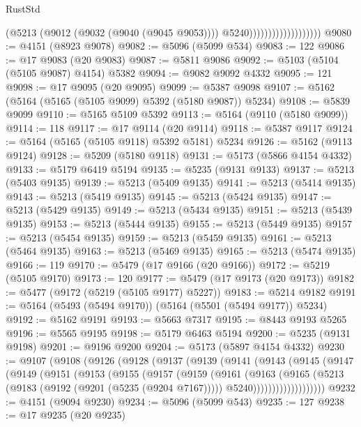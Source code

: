 \begin{lexlean}{RustStd}
\begin{coremodule}
                                        (@5213
                                          (@9012 (@9032 (@9040 (@9045 @9053))))
                                          @5240)))))))))))))))))))
@9080 := @4151 (@8923 @9078)
@9082 := @5096 (@5099 @534)
@9083 := 122
@9086 := @17 @9083 (@20 @9083)
@9087 := @5811 @9086
@9092 := @5103 (@5104 (@5105 @9087) @4154) @5382
@9094 := @9082 @9092 @4332
@9095 := 121
@9098 := @17 @9095 (@20 @9095)
@9099 := @5387 @9098
@9107 := @5162 (@5164 (@5165 (@5105 @9099) @5392 (@5180 @9087)) @5234)
@9108 := @5839 @9099
@9110 := @5165 @5109 @5392
@9113 := @5164 (@9110 (@5180 @9099))
@9114 := 118
@9117 := @17 @9114 (@20 @9114)
@9118 := @5387 @9117
@9124 := @5164 (@5165 (@5105 @9118) @5392 @5181) @5234
@9126 := @5162 (@9113 @9124)
@9128 := @5209 (@5180 @9118)
@9131 := @5173 (@5866 @4154 @4332)
@9133 := @5179 @6419 @5194
@9135 := @5235 (@9131 @9133)
@9137 := @5213 (@5403 @9135)
@9139 := @5213 (@5409 @9135)
@9141 := @5213 (@5414 @9135)
@9143 := @5213 (@5419 @9135)
@9145 := @5213 (@5424 @9135)
@9147 := @5213 (@5429 @9135)
@9149 := @5213 (@5434 @9135)
@9151 := @5213 (@5439 @9135)
@9153 := @5213 (@5444 @9135)
@9155 := @5213 (@5449 @9135)
@9157 := @5213 (@5454 @9135)
@9159 := @5213 (@5459 @9135)
@9161 := @5213 (@5464 @9135)
@9163 := @5213 (@5469 @9135)
@9165 := @5213 (@5474 @9135)
@9166 := 119
@9170 := @5479 (@17 @9166 (@20 @9166))
@9172 := @5219 (@5105 @9170)
@9173 := 120
@9177 := @5479 (@17 @9173 (@20 @9173))
@9182 := @5477 (@9172 (@5219 (@5105 @9177) @5227))
@9183 := @5214 @9182
@9191 := @5164 (@5493 (@5494 @9170)) (@5164 (@5501 (@5494 @9177)) @5234)
@9192 := @5162 @9191
@9193 := @5663 @7317
@9195 := @8443 @9193 @5265
@9196 := @5565 @9195
@9198 := @5179 @6463 @5194
@9200 := @5235 (@9131 @9198)
@9201 := @9196 @9200
@9204 := @5173 (@5897 @4154 @4332)
@9230 := @9107
    (@9108
      (@9126
        (@9128
          (@9137
            (@9139
              (@9141
                (@9143
                  (@9145
                    (@9147
                      (@9149
                        (@9151
                          (@9153
                            (@9155
                              (@9157
                                (@9159
                                  (@9161
                                    (@9163
                                      (@9165
                                        (@5213
                                          (@9183 (@9192 (@9201 (@5235 (@9204 @7167)))))
                                          @5240)))))))))))))))))))
@9232 := @4151 (@9094 @9230)
@9234 := @5096 (@5099 @543)
@9235 := 127
@9238 := @17 @9235 (@20 @9235)

\end{coremodule}
\end{lexlean}
